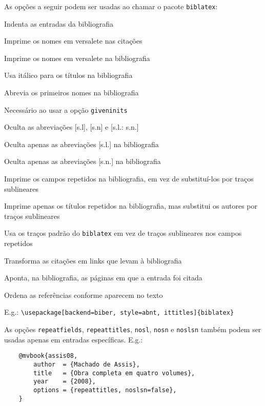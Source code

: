 \documentclass[a4paper]{article}
\begin{document}
As opções a seguir podem ser usadas ao chamar o pacote \texttt{biblatex}:

\begin{description}[parsep=8pt,itemindent=-1em,leftmargin=3em]
    \item [indent] Indenta as entradas da bibliografia
    \item [sccite] Imprime os nomes em versalete nas citações
    \item [scbib] Imprime os nomes em versalete na bibliografia
    \item [ittitles] Usa itálico para os títulos na bibliografia
    \item [giveninits] Abrevia os primeiros nomes na bibliografia
    \item [uniquename=init] Necessário ao usar a opção \texttt{giveninits}
    \item [noslsn] Oculta as abreviações [s.l], [s.n] e [s.l.: s.n.]
    \item [nosl] Oculta apenas as abreviações [s.l.] na bibliografia
    \item [nosn] Oculta apenas as abreviações [s.n.] na bibliografia    \item [repeatfields] Imprime os campos repetidos na bibliografia, em vez de substituí-los por traços sublineares
    \item [repeattitles] Imprime apenas os títulos repetidos na bibliografia, mas substitui os autores por traços sublineares
    \item [usedashes] Usa os traços padrão do \texttt{biblatex} em vez de traços sublineares nos campos repetidos
    \item [hyperref] Transforma as citações em links que levam à bibliografia
    \item [backref] Aponta, na bibliografia, as páginas em que a entrada foi citada
    \item [sorting=none] Ordena as referências conforme aparecem no texto
\end{description}

\vspace{\baselineskip}
E.g.: \verb"\usepackage[backend=biber, style=abnt, ittitles]{biblatex}"

As opções \texttt{repeatfields}, \texttt{repeattitles}, \texttt{nosl}, \texttt{nosn} e \texttt{noslsn} também podem ser usadas apenas em entradas específicas. E.g.:

\begin{verbatim}
    @mvbook{assis08,
        author  = {Machado de Assis},
        title   = {Obra completa em quatro volumes},
        year    = {2008},
        options = {repeattitles, noslsn=false},
    }
\end{verbatim}
\end{document}
